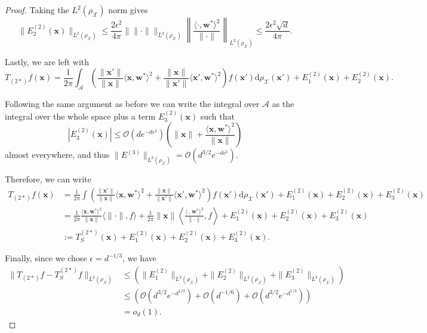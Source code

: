 \begin{proof}
    Taking the $L^2(\rho_{\mathcal X})$ norm gives
    \[
        \|E_2^{(2)}(\bm x)\|_{L^2(\rho_{\mathcal X})} \leq \frac{2\epsilon^2}{4\pi} \Big\|\|\cdot\|\Big\|_{L^2(\rho_{\mathcal X})}\left\|\frac{\langle \cdot, \bm w^*\rangle^2}{\|\cdot\|}\right\|_{L^2(\rho_{\mathcal X})} \leq \frac{2\epsilon^2 \sqrt{d}}{4\pi}.
    \]

    Lastly, we are left with
    \[
        T_{(2*)}f(\bm x) = \frac{1}{2\pi }\int_{\mathcal A} \left(\frac{\|\bm x'\|}{\|\bm x\|}\langle \bm x, \bm w^*\rangle^2 + \frac{\|\bm x\|}{\|\bm x'\|}\langle \bm x', \bm w^*\rangle^2\right)f(\bm x')\mathrm d\rho_{\mathcal X}(\bm x') + E_1^{(2)}(\bm x) + E_2^{(2)}(\bm x).
    \]
    
    Following the same argument as before we can write the integral over $\mathcal A$ as the integral over the whole space plus a term $E_3^{(2)}(\bm x)$ such that 
    \[
        |E_3^{(2)}(\bm x)| \leq \mathcal O(de^{-d \epsilon^2})\left(\|\bm x\| + \frac{\langle \bm x, \bm w^*\rangle ^2}{\|\bm x\|}\right)
    \]
    almost everywhere, and thus $\|E^{(3)}\|_{L^2(\rho_{\mathcal X})} =  \mathcal O(d^{3/2}e^{-d \epsilon^2})$.
    
    
    Therefore, we can write
    \begin{align*}
        T_{(2*)}f(\bm x) &= \frac{1}{2\pi}\int \left(\frac{\|\bm x'\|}{\|\bm x\|}\langle \bm x, \bm w^*\rangle^2 + \frac{\|\bm x\|}{\|\bm x'\|}\langle \bm x', \bm w^*\rangle^2\right)f(\bm x')\mathrm d\rho_{\mathcal X}(\bm x') + E_1^{(2)}(\bm x) + E_2^{(2)}(\bm x) + E_3^{(2)}(\bm x)\\
        & = \frac{1}{2\pi}\frac{\langle \bm x, \bm w^*\rangle^2}{\|\bm x\|} \langle \|\cdot\|, f\rangle + \frac{1}{2\pi}\|\bm x \| \left\langle \frac{\langle \cdot, \bm w^*\rangle^2}{\|\cdot\|}, f \right\rangle + E_1^{(2)}(\bm x) + E_2^{(2)}(\bm x) + E_3^{(2)}(\bm x)\\
        &:= T_{S}^{(2*)}(\bm x) + E_1^{(2)}(\bm x) + E_2^{(2)}(\bm x) + E_3^{(2)}(\bm x).
    \end{align*}

    Finally, since we chose $\epsilon = d^{-1/3}$, we have
    \begin{align*}
        \|T_{(2*)}f - T_{S}^{(2*)}f\|_{L^2(\rho_{\mathcal X})} &\leq \left(\|E_1^{(2)}\|_{L^2(\rho_{\mathcal X})} + \|E_2^{(2)}\|_{L^2(\rho_{\mathcal X})} + \|E_3^{(2)}\|_{L^2(\rho_{\mathcal X})}\right) \\
        &\leq \left(\mathcal O(d^{3/2}e^{-d^{1/3}})+ \mathcal O(d^{-1/6}) + \mathcal O(d^{3/2}e^{-d^{1/3}})\right)\\
        &= o_d(1).
    \end{align*}
\end{proof}


